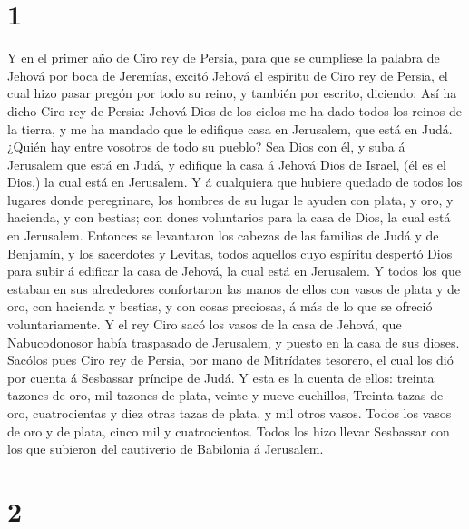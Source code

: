 \hypertarget{section}{%
\section{1}\label{section}}

 Y en el primer año de Ciro rey de Persia, para que se
cumpliese la palabra de Jehová por boca de Jeremías, excitó Jehová el
espíritu de Ciro rey de Persia, el cual hizo pasar pregón por todo su
reino, y también por escrito, diciendo:  Así ha dicho Ciro
rey de Persia: Jehová Dios de los cielos me ha dado todos los reinos de
la tierra, y me ha mandado que le edifique casa en Jerusalem, que está
en Judá.  ¿Quién hay entre vosotros de todo su pueblo? Sea
Dios con él, y suba á Jerusalem que está en Judá, y edifique la casa á
Jehová Dios de Israel, (él es el Dios,) la cual está en Jerusalem.
 Y á cualquiera que hubiere quedado de todos los lugares
donde peregrinare, los hombres de su lugar le ayuden con plata, y oro, y
hacienda, y con bestias; con dones voluntarios para la casa de Dios, la
cual está en Jerusalem.  Entonces se levantaron los cabezas
de las familias de Judá y de Benjamín, y los sacerdotes y Levitas, todos
aquellos cuyo espíritu despertó Dios para subir á edificar la casa de
Jehová, la cual está en Jerusalem.  Y todos los que estaban
en sus alrededores confortaron las manos de ellos con vasos de plata y
de oro, con hacienda y bestias, y con cosas preciosas, á más de lo que
se ofreció voluntariamente.  Y el rey Ciro sacó los vasos de
la casa de Jehová, que Nabucodonosor había traspasado de Jerusalem, y
puesto en la casa de sus dioses.  Sacólos pues Ciro rey de
Persia, por mano de Mitrídates tesorero, el cual los dió por cuenta á
Sesbassar príncipe de Judá.  Y esta es la cuenta de ellos:
treinta tazones de oro, mil tazones de plata, veinte y nueve cuchillos,
 Treinta tazas de oro, cuatrocientas y diez otras tazas de
plata, y mil otros vasos.  Todos los vasos de oro y de
plata, cinco mil y cuatrocientos. Todos los hizo llevar Sesbassar con
los que subieron del cautiverio de Babilonia á Jerusalem.

\hypertarget{section-1}{%
\section{2}\label{section-1}}

